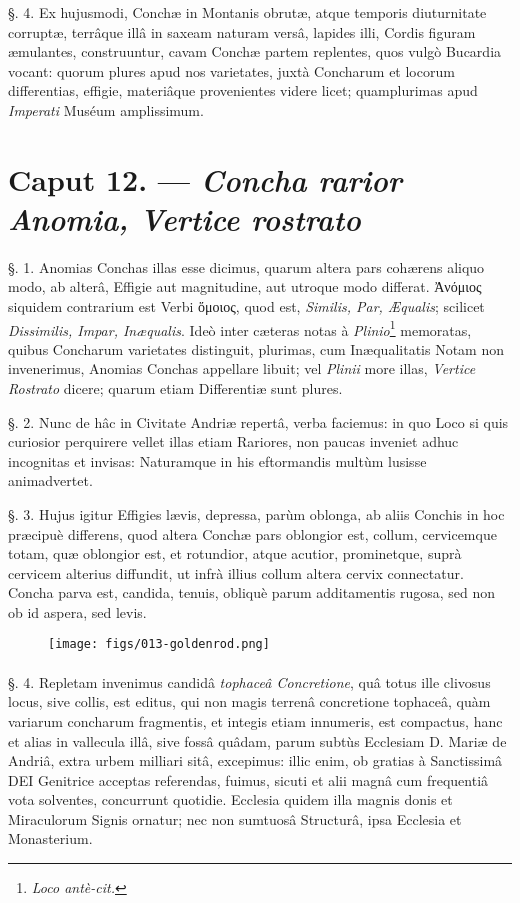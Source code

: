 \documentclass[a4paper, 11pt, oneside, polutonikogreek, german]{article}
\begin{document}
§. 4. Ex hujusmodi, Conchæ in Montanis obrutæ, atque temporis diuturnitate corruptæ, terrâque illâ in saxeam naturam versâ, lapides illi, Cordis figuram æmulantes, construuntur, cavam Conchæ partem replentes, quos vulgò Bucardia vocant: quorum plures apud nos varietates, juxtà Concharum et locorum differentias, effigie, materiâque provenientes videre licet; quamplurimas apud \emph{Imperati} Muséum amplissimum.

\section{Caput 12. --- \emph{Concha rarior Anomia, Vertice rostrato}}
\paragraph{}
§. 1. Anomias Conchas illas esse dicimus, quarum altera pars cohærens aliquo modo, ab alterâ, Effigie aut magnitudine, aut utroque modo differat. Ἀνόμιος siquidem contrarium est Verbi ὅμοιος, quod est, \emph{Similis, Par, Æqualis}; scilicet \emph{Dissimilis, Impar, Inæqualis}. Ideò inter cæteras notas à \emph{Plinio}\footnote{\emph{Loco antè-cit.}} memoratas, quibus Concharum varietates distinguit, plurimas, cum Inæqualitatis Notam non invenerimus, Anomias Conchas appellare libuit; vel \emph{Plinii} more illas, \emph{Vertice Rostrato} dicere; quarum etiam Differentiæ sunt plures.

§. 2. Nunc de hâc in Civitate Andriæ repertâ, verba faciemus: in quo Loco si quis curiosior perquirere vellet illas etiam Rariores, non paucas inveniet adhuc incognitas et invisas: Naturamque in his eftormandis multùm lusisse animadvertet.

§. 3. Hujus igitur Effigies lævis, depressa, parùm oblonga, ab aliis Conchis in hoc præcipuè differens, quod altera Conchæ pars oblongior est, collum, cervicemque totam, quæ oblongior est, et rotundior, atque acutior, prominetque, suprà cervicem alterius diffundit, ut infrà illius collum altera cervix connectatur. Concha parva est, candida, tenuis, obliquè parum additamentis rugosa, sed non ob id aspera, sed levis.

\begin{figure}[H]
\centering
\texttt{[image: figs/013-goldenrod.png]}

\end{figure}
\paragraph{}
§. 4. Repletam invenimus candidâ \emph{tophaceâ Concretione}, quâ totus ille clivosus locus, sive collis, est editus, qui non magis terrenâ concretione tophaceâ, quàm variarum concharum fragmentis, et integis etiam innumeris, est compactus, hanc et alias in vallecula illâ, sive fossâ quâdam, parum subtùs Ecclesiam D. Mariæ de Andriâ, extra urbem milliari sitâ, excepimus: illic enim, ob gratias à Sanctissimâ DEI Genitrice acceptas referendas, fuimus, sicuti et alii magnâ cum frequentiâ vota solventes, concurrunt quotidie. Ecclesia quidem illa magnis donis et Miraculorum Signis ornatur; nec non sumtuosâ Structurâ, ipsa Ecclesia et Monasterium.
\end{document}
